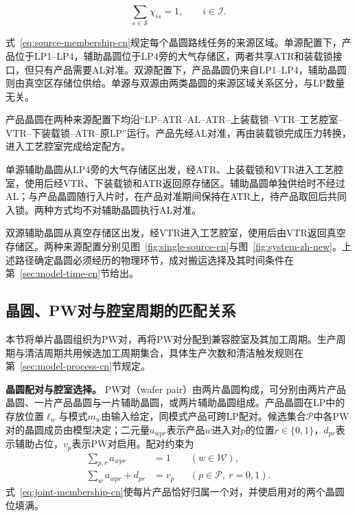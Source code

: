 \documentclass[final,5p,times,twocolumn]{elsarticle}
\begin{document}
\begin{equation}
\sum_{s\in\mathcal S}\chi_{is}=1,
\qquad i\in\mathcal I.
\label{eq:source-membership-cn}
\end{equation}

式~\eqref{eq:source-membership-cn}规定每个晶圆路线任务的来源区域。单源配置下，产品位于LP1--LP4，辅助晶圆位于LP4旁的大气存储区，两者共享ATR和装载锁接口，但只有产品需要AL对准。双源配置下，产品晶圆仍来自LP1--LP4，辅助晶圆则由真空区存储位供给。单源与双源由两类晶圆的来源区域关系区分，与LP数量无关。

产品晶圆在两种来源配置下均沿“LP--ATR--AL--ATR--上装载锁--VTR--工艺腔室--VTR--下装载锁--ATR--原LP”运行。产品先经AL对准，再由装载锁完成压力转换，进入工艺腔室完成给定配方。

单源辅助晶圆从LP4旁的大气存储区出发，经ATR、上装载锁和VTR进入工艺腔室，使用后经VTR、下装载锁和ATR返回原存储区。辅助晶圆单独供给时不经过AL；与产品晶圆随行入片时，在产品对准期间保持在ATR上，待产品取回后共同入锁。两种方式均不对辅助晶圆执行AL对准。

双源辅助晶圆从真空存储区出发，经VTR进入工艺腔室，使用后由VTR返回真空存储区。两种来源配置分别见图~\ref{fig:single-source-cn}与图~\ref{fig:system-zh-new}。上述路径确定晶圆必须经历的物理环节，成对搬运选择及其时间条件在第~\ref{sec:model-time-cn}节给出。

\subsection{晶圆、PW对与腔室周期的匹配关系}
\label{sec:model-assignment-cn}

本节将单片晶圆组织为PW对，再将PW对分配到兼容腔室及其加工周期。生产周期与清洁周期共用候选加工周期集合，具体生产次数和清洁触发规则在第~\ref{sec:model-process-cn}节规定。

\noindent\textbf{晶圆配对与腔室选择。}
PW对（wafer pair）由两片晶圆构成，可分别由两片产品晶圆、一片产品晶圆与一片辅助晶圆，或两片辅助晶圆组成。产品晶圆在LP中的存放位置$\ell_w$与模式$m_w$由输入给定，同模式产品可跨LP配对。候选集合$\mathcal P$中各PW对的晶圆成员由模型决定；二元量$a_{wpr}$表示产品$w$进入对$p$的位置$r\in\{0,1\}$，$d_{pr}$表示辅助占位，$v_p$表示PW对启用。配对约束为
\begin{equation}
\begin{aligned}
\sum_{p,r}a_{wpr}&=1 &&(w\in\mathcal W),\\
\sum_w a_{wpr}+d_{pr}&=v_p &&(p\in\mathcal P,\ r=0,1).
\end{aligned}
\label{eq:joint-membership-cn}
\end{equation}
式~\eqref{eq:joint-membership-cn}使每片产品恰好归属一个对，并使启用对的两个晶圆位填满。
\end{document}
